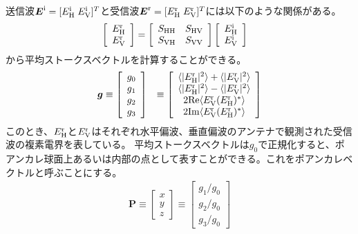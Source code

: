 \documentclass[a4j, twocolumn]{jsarticle}
\begin{document}
送信波$\mbox{\boldmath $E$}^{\rm i}=[E_{\rm{H}}^{\rm i} \; E_{\rm{V}}^{\rm i}]^{T}$と受信波$\mbox{\boldmath $E$}^{\rm r}=[E_{\rm{H}}^{\rm r} \; E_{\rm{V}}^{\rm r}]^{T}$には以下のような関係がある。
\begin{align}\label{S_matrix}
\left[
\begin{array}{c}
E^{\rm r}_{\rm H} \\
E^{\rm r}_{\rm V}
\end{array}
\right]
&=
\left[
\begin{array}{cc}
S_{\rm{HH}} & S_{\rm{HV}}\\
S_{\rm{VH}} & S_{\rm{VV}}
\end{array}
\right]
\left[
\begin{array}{c}
E^{\rm i}_{\rm H} \\
E^{\rm i}_{\rm V}
\end{array}
\right]
\end{align}
から平均ストークスベクトルを計算することができる。
\begin{eqnarray}
	\bm{g} & \equiv
	\left[\begin{array}{c}
		g_{0}\\
		g_{1}\\
		g_{2}\\
		g_{3}
	\end{array}
	\right]
	& \equiv
	\left[\begin{array}{c}
		\langle{|E^{\rm r}_{\rm H}|^{2}}\rangle + \langle{|E^{\rm r}_{\rm V}|^{2}}\rangle\\
		\langle{|E^{\rm r}_{\rm H}|^{2}}\rangle - \langle{|E^{\rm r}_{\rm V}|^{2}}\rangle\\
		2{\rm Re}\langle{E^{\rm r}_{\rm V}}(E^{\rm r}_{\rm H})^{*}\rangle\\
		2{\rm Im}\langle{E^{\rm r}_{\rm V}}(E^{\rm r}_{\rm H})^{*}\rangle
	\end{array}
	\right]
\end{eqnarray}
このとき、$E^{\rm r}_{\rm H}$と$E^{\rm r}_{\rm V}$はそれぞれ水平偏波、垂直偏波のアンテナで観測された受信波の複素電界を表している。
平均ストークスベクトルは$g_{0}$で正規化すると、ポアンカレ球面上あるいは内部の点として表すことができる。これをポアンカレベクトルと呼ぶことにする。
\begin{eqnarray}
	\bm{P} \equiv \left[
	\begin{array}{c}
		x\\
		y\\
		z
	\end{array}
	\right]
	\equiv \left[
	\begin{array}{c}
		{g_{1}}/{g_{0}}\\
		{g_{2}}/{g_{0}}\\
		{g_{3}}/{g_{0}}
	\end{array}\right]
\end{eqnarray}
\end{document}
